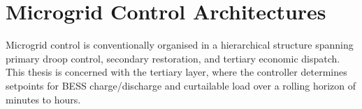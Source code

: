 \section{Microgrid Control Architectures}

Microgrid control is conventionally organised in a hierarchical structure spanning primary droop control, secondary restoration, and tertiary economic dispatch. This thesis is concerned with the tertiary layer, where the controller determines setpoints for BESS charge/discharge and curtailable load over a rolling horizon of minutes to hours.
